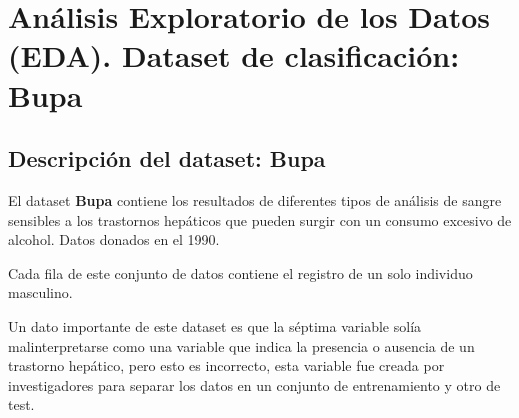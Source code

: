 \chapter{Análisis Exploratorio de los Datos (EDA). Dataset de clasificación: Bupa}

\section{Descripción del dataset: Bupa}
El dataset \textbf{Bupa} contiene los resultados de diferentes tipos de análisis de sangre sensibles a los trastornos hepáticos que pueden surgir con un consumo excesivo de alcohol. Datos donados en el 1990.

Cada fila de este conjunto de datos contiene el registro de un solo individuo masculino.

Un dato importante de este dataset es que la séptima variable solía malinterpretarse como una variable que indica la presencia o ausencia de un trastorno hepático, pero esto es incorrecto, esta variable fue creada por investigadores para separar los datos en un conjunto de entrenamiento y otro de test.


